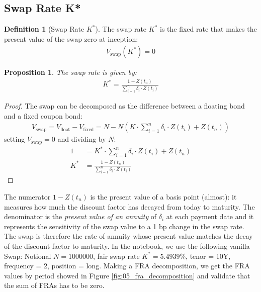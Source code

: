 \documentclass{article}
\theoremstyle{definition}  %
\newtheorem{definition}{Definition}[section]
\theoremstyle{plain}  %
\newtheorem{proposition}{Proposition}[section]
\numberwithin{definition}{section}
\numberwithin{proposition}{section}
\numberwithin{theorem}{section}
\numberwithin{equation}{section}
\begin{document}
\subsection{Swap Rate K*}

\begin{definition}[Swap Rate $K^{*}$]
    The swap rate $K^{*}$ is the fixed rate that makes the present value of the swap zero at inception:
    \begin{align*}
        V_{\text{swap}}(K^{*}) = 0
    \end{align*}
\end{definition}

\begin{proposition}
    The swap rate is given by:
    \begin{align*}
        K^{*} = \frac{1 - Z(t_{n})}{\sum_{i = 1}^{n} \delta_{i} \cdot Z(t_{i})}
    \end{align*}
\end{proposition}

\begin{proof}
    The swap can be decomposed as the difference between a floating bond and a fixed coupon bond:
    \begin{align*}
        V_{\text{swap}} = V_{\text{float}} - V_{\text{fixed}} = N - N \left(K \cdot \sum_{i = 1}^{n} \delta_{i} \cdot Z(t_{i}) + Z(t_{n})\right)
    \end{align*}
    setting $V_{\text{swap}} = 0$ and dividing by $N$:
    \begin{align*}
        1 &= K^{*} \cdot \sum_{i = 1}^{n} \delta_{i} \cdot Z(t_{i}) + Z(t_{n}) \\
        K^{*} &= \frac{1 - Z(t_{n})}{\sum_{i = 1}^{n} \delta_{i} \cdot Z(t_{i})}
    \end{align*}
\end{proof}

The numerator $1 - Z(t_{n})$ is the present value of a basis point (almost): it measures how much the discount factor has decayed from today to maturity. The denominator is the \textit{present value of an annuity} of $\delta_{i}$ at each payment date and it represents the sensitivity of the swap value to a 1 bp change in the swap rate. The swap is therefore the rate of annuity whose present value matches the decay of the discount factor to maturity. In the notebook, we use the following vanilla Swap: Notional $N = 1000000$, fair swap rate $K^{*} = 5.4939 \%$, tenor = 10Y, frequency = 2, position = long. Making a FRA decomposition, we get the FRA values by period showed in Figure \ref{fig:05_fra_decomposition} and validate that the sum of FRAs has to be zero.
\end{document}
